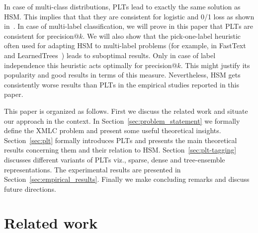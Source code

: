 \documentclass{article}
\newcommand{\Algo}[1]{\textsc{#1}}
\newcommand{\sectionBefore}{-0pt}
\newcommand{\sectionAfter}{-0pt}
\begin{document}

In case of multi-class distributions, \Algo{PLT}s lead to exactly the
same solution as HSM. This implies that that they are consistent for
logistic and 0/1 loss as shown in~\citep{Dembczynski_et_al_2016}. In
case of multi-label classification, we will prove in this paper that
\Algo{PLT}s are consistent for precision@$k$. We will also show that
the pick-one-label heuristic often used for adapting \Algo{HSM} to
multi-label problems (for example, in
FastText~\citep{Joulin_et_al_2016} and
LearnedTrees~\citep{Jernite_et_al_2017}) leads to suboptimal
results. Only in case of label independence this heuristic acts
optimally for precision@$k$. This might justify its popularity and
good results in terms of this measure. Nevertheless, \Algo{HSM} gets
consistently worse results than \Algo{PLT}s in the empirical studies
reported in this paper.
%

This paper is organized as follows. First we discuss the related work
and situate our approach in the context. In
Section~\ref{sec:problem_statement} we formally define the XMLC
problem and present some useful theoretical
insights. Section~\ref{sec:plt} formally introduces \Algo{PLT}s and
presents the main theoretical results concerning them and their
relation to \Algo{HSM}. Section~\ref{sec:plt-tagging} discusses
different variants of \Algo{PLT}s viz., sparse, dense and tree-ensemble representations. The
experimental results are presented in
Section~\ref{sec:empirical_results}. Finally we make concluding remarks and discuss future directions.



\vspace{\sectionBefore}
\section{Related work}
\label{sec:related_work}
\vspace{\sectionAfter}
\end{document}
